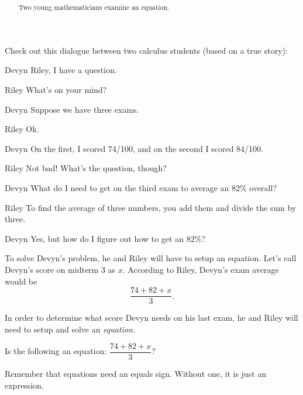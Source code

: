 \documentclass{ximera}
\title[Break-Ground:]{  }
\begin{document}
\begin{abstract}
  Two young mathematicians examine an equation.
\end{abstract}
\maketitle

Check out this dialogue between two calculus students (based on a true
story):

\begin{dialogue}
	\item[Devyn] Riley, I have a question.
	\item[Riley] What's on your mind?
	\item[Devyn] Suppose we have three exams.  
	\item[Riley]  Ok. 
	\item[Devyn] On the first, I scored 74/100, and on the second I scored 84/100.
	\item[Riley] Not bad!  What's the question, though?
	\item[Devyn] What do I need to get on the third exam to average an 82\% overall?
	\item[Riley] To find the average of three numbers, you add them and divide the sum by three.
	\item[Devyn] Yes, but how do I figure out how to get an 82\%?
\end{dialogue}

To solve Devyn's problem, he and Riley will have to setup an equation.  Let's call Devyn's score on midterm 3 as $x$.  According to Riley, Devyn's exam average
would be \[ \frac{74 + 82 + x}{3}. \]

In order to determine what score Devyn needs on his last exam, he and Riley will need to setup and solve an \emph{equation}.


\begin{problem}
  Is the following an equation: $\displaystyle \dfrac{74 + 82 + x}{3}$?

  \begin{multipleChoice}
  \end{multipleChoice}

  \begin{feedback}
  Remember that equations need an equals sign.  Without one, it is just an expression.  
  \end{feedback}
\end{problem}



\end{document}
